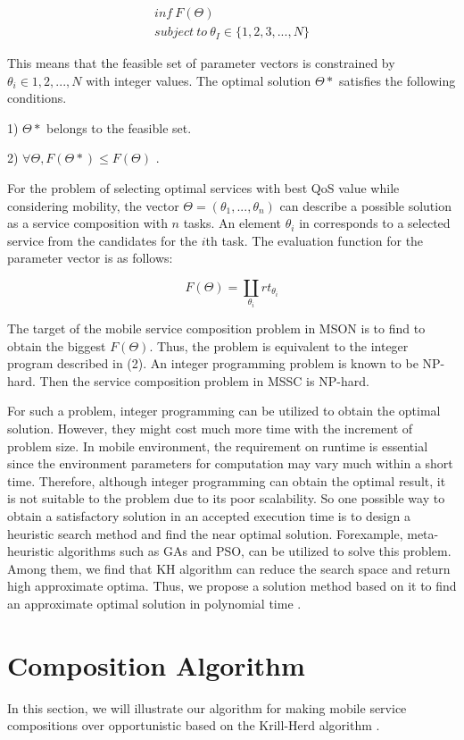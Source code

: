 \documentclass[10pt,journal,compsoc]{IEEEtran}
\begin{document}
\begin{eqnarray}
inf \ F(\Theta)\\\nonumber
subject \ to \ \theta_I \in\{1,2,3,...,N\}
\end{eqnarray}

This means that the feasible set of parameter vectors is constrained by $\theta_i \in {1, 2, . . . , N}$ with integer values. The optimal solution  $\Theta*$ satisfies the following conditions.

1) $\Theta *$ belongs to the feasible set.

​2) $\forall \Theta, F(\Theta*) \le F(\Theta)$ .

For the problem of selecting optimal services with best QoS value while considering mobility, the vector  $\Theta= (θ_1, . . . , θ_n)$ can describe a possible solution as a service composition with $n$ tasks. An element $θ_i$ in corresponds to a selected service from the candidates for the $i$th task. The evaluation function for the parameter vector is as follows:

\begin{equation}
F(\Theta) = \coprod_{\theta_i}rt_{\theta_i}
\end{equation}

The target of the mobile service composition problem in MSON is to find  to obtain the biggest $F( \Theta)$. Thus, the problem is equivalent to the integer program described in (2). An integer programming problem is known to be NP-hard. Then the service composition problem in MSSC is NP-hard.

For such a problem, integer programming can be utilized to obtain the optimal solution. However, they might cost much more time with the increment of problem size. In mobile environment, the requirement on runtime is essential since the environment parameters for computation may vary much within a short time. Therefore, although integer programming can obtain the optimal result, it is not suitable to the problem due to its poor scalability. So one possible way to obtain a satisfactory solution in an accepted execution time is to design a heuristic search method and find the near optimal solution. Forexample, meta-heuristic algorithms such as GAs and PSO, can be utilized to solve this problem. Among them, we find that KH algorithm can reduce the search space and return high approximate optima. Thus, we propose a solution method based on it to find an approximate optimal solution in polynomial time \cite{Deng2017}.

\section{Composition Algorithm}
In this section, we will illustrate our algorithm for making mobile service compositions over opportunistic based on the Krill-Herd algorithm \cite{Deng2017}.
\end{document}
